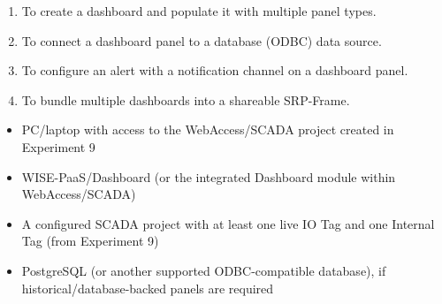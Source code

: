 
\begin{objectives}
  \begin{enumerate}
    \item To create a dashboard and populate it with multiple panel types.
    \item To connect a dashboard panel to a database (ODBC) data source.
    \item To configure an alert with a notification channel on a dashboard panel.
    \item To bundle multiple dashboards into a shareable SRP-Frame.
  \end{enumerate}
\end{objectives}

\begin{equipment}
  \begin{itemize}
    \item PC/laptop with access to the WebAccess/SCADA project created in Experiment 9
    \item WISE-PaaS/Dashboard (or the integrated Dashboard module within WebAccess/SCADA)
    \item A configured SCADA project with at least one live IO Tag and one Internal Tag (from Experiment 9)
    \item PostgreSQL (or another supported ODBC-compatible database), if historical/database-backed panels are required
  \end{itemize}
\end{equipment}

